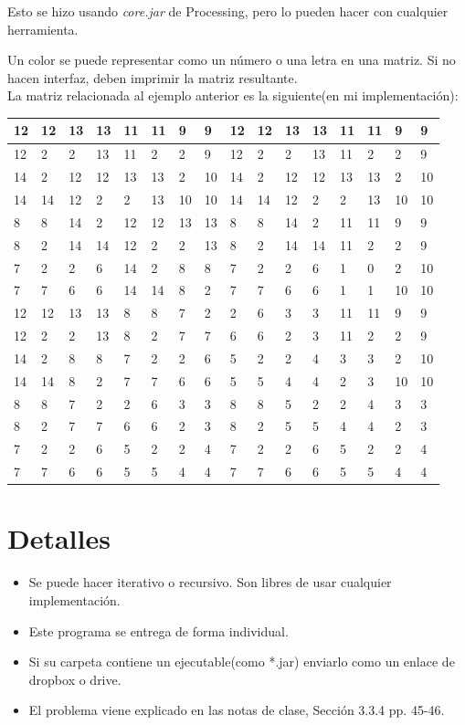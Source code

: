\documentclass{article}
\begin{document}
Esto se hizo usando \textit{core.jar} de Processing, pero lo pueden hacer con cualquier herramienta.

Un color se puede representar como un número o una letra en una matriz. Si no hacen interfaz, deben imprimir la matriz resultante.\\

La matriz relacionada al ejemplo anterior es la siguiente(en mi implementación):

\begin{table}[h]
\begin{center}
\begin{tabular}{|l|l|l|l|l|l|l|l|l|l|l|l|l|l|l|l|}
\hline
12&12&13&13&11&11&9&9&12&12&13&13&11&11&9&9\\ \hline
12&2&2&13&11&2&2&9&12&2&2&13&11&2&2&9\\ \hline
14&2&12&12&13&13&2&10&14&2&12&12&13&13&2&10\\ \hline
14&14&12&2&2&13&10&10&14&14&12&2&2&13&10&10\\ \hline
8&8&14&2&12&12&13&13&8&8&14&2&11&11&9&9\\ \hline
8&2&14&14&12&2&2&13&8&2&14&14&11&2&2&9\\ \hline
7&2&2&6&14&2&8&8&7&2&2&6&1&0&2&10\\ \hline
7&7&6&6&14&14&8&2&7&7&6&6&1&1&10&10\\ \hline
12&12&13&13&8&8&7&2&2&6&3&3&11&11&9&9\\ \hline
12&2&2&13&8&2&7&7&6&6&2&3&11&2&2&9\\ \hline
14&2&8&8&7&2&2&6&5&2&2&4&3&3&2&10\\ \hline
14&14&8&2&7&7&6&6&5&5&4&4&2&3&10&10 \\ \hline
8&8&7&2&2&6&3&3&8&8&5&2&2&4&3&3\\ \hline
8&2&7&7&6&6&2&3&8&2&5&5&4&4&2&3\\ \hline
7&2&2&6&5&2&2&4&7&2&2&6&5&2&2&4\\ \hline
7&7&6&6&5&5&4&4&7&7&6&6&5&5&4&4\\ \hline
\end{tabular}
\end{center}
\end{table}

\newpage

\section{Detalles}

\begin{itemize}
\item Se puede hacer iterativo o recursivo. Son libres de usar cualquier implementación.
\item Este programa se entrega de forma individual.
\item Si su carpeta contiene un ejecutable(como *.jar) enviarlo como un enlace de dropbox o drive.
\item El problema viene explicado en las notas de clase, Sección 3.3.4 pp. 45-46.
\end{itemize}
\end{document}
